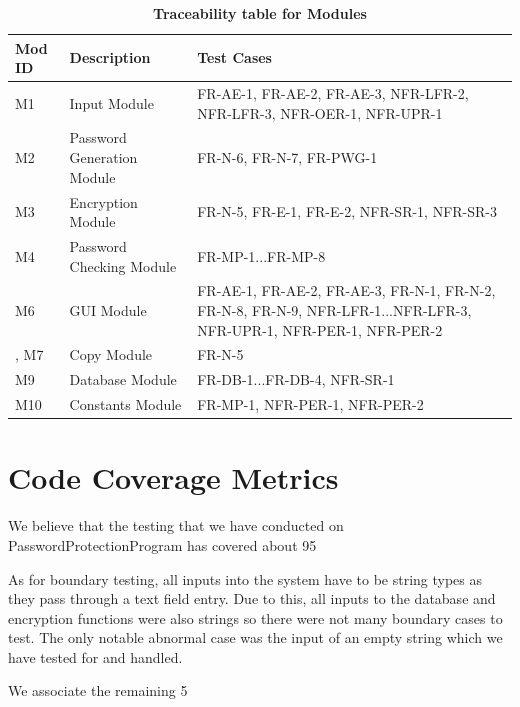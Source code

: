 \documentclass[12pt, titlepage]{article}
\begin{document}
\begin{table}[!htbp]
    \caption{\textbf{Traceability table for Modules}} \label{Table}
    \begin{tabularx}{\textwidth}{p{2cm}Xp{4cm}}
        \toprule
        \textbf{Mod ID} & \textbf{Description} & \textbf{Test Cases}\\
        \midrule
        M1  & Input Module & FR-AE-1, FR-AE-2, FR-AE-3, NFR-LFR-2, NFR-LFR-3, NFR-OER-1, NFR-UPR-1\\\hline
        M2  & Password Generation Module & FR-N-6, FR-N-7, FR-PWG-1\\\hline
        M3  & Encryption Module & FR-N-5, FR-E-1, FR-E-2, NFR-SR-1, NFR-SR-3\\\hline
        M4  & Password Checking Module & FR-MP-1...FR-MP-8 \\\hline
        M6  & GUI Module & FR-AE-1, FR-AE-2, FR-AE-3, FR-N-1, FR-N-2, FR-N-8, FR-N-9, NFR-LFR-1...NFR-LFR-3, NFR-UPR-1, NFR-PER-1, NFR-PER-2\\\hline, 
        M7  & Copy Module & FR-N-5\\\hline
        M9  & Database Module & FR-DB-1...FR-DB-4, NFR-SR-1\\\hline
        M10 & Constants Module & FR-MP-1, NFR-PER-1, NFR-PER-2\\\hline
    
        \bottomrule
    \end{tabularx}
\end{table}



\section{Code Coverage Metrics}

We believe that the testing that we have conducted on PasswordProtectionProgram has covered about 95%

As for boundary testing, all inputs into the system have to be string types as they pass through a text field entry. Due to this, all inputs to the database and encryption functions were also strings so there were not many boundary cases to test. The only notable abnormal case was the input of an empty string which we have tested for and handled.

We associate the remaining 5%




\end{document}
